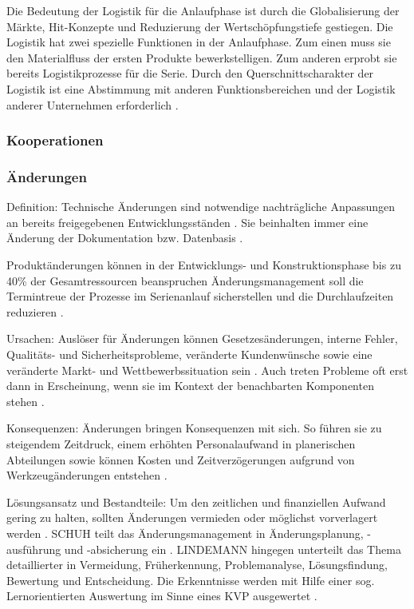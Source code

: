 Die Bedeutung der Logistik für die Anlaufphase ist durch die Globalisierung der Märkte, Hit-Konzepte und Reduzierung der Wertschöpfungstiefe gestiegen. Die Logistik hat zwei spezielle Funktionen in der Anlaufphase. Zum einen muss sie den Materialfluss der ersten Produkte bewerkstelligen. Zum anderen erprobt sie bereits Logistikprozesse für die Serie.
Durch den Querschnittscharakter der Logistik ist eine Abstimmung mit anderen Funktionsbereichen und der Logistik anderer Unternehmen erforderlich \cite[1189]{Pfohl2000}.

\subsubsection*{Kooperationen}

\subsubsection*{Änderungen}

Definition: 
Technische Änderungen sind notwendige nachträgliche Anpassungen an bereits freigegebenen Entwicklungsständen \cite{Zanner2002}. Sie beinhalten immer eine Änderung der Dokumentation bzw. Datenbasis \cite[47]{Niemerg1997}. 	


Produktänderungen können in der Entwicklungs- und Konstruktionsphase bis zu 40\% der Gesamtressourcen beanspruchen \cite{Lindemann1998}
Änderungsmanagement soll die Termintreue der Prozesse im Serienanlauf sicherstellen und die Durchlaufzeiten reduzieren \cite[216]{Schuh2008}. 

Ursachen: 
Auslöser für Änderungen können Gesetzesänderungen, interne Fehler, Qualitäts- und Sicherheitsprobleme, veränderte Kundenwünsche sowie eine veränderte Markt- und Wettbewerbssituation sein \cite{Zanner2002}. Auch treten Probleme oft erst dann in Erscheinung, wenn sie im Kontext der benachbarten Komponenten stehen \cite[24]{Kuhn2002}.

Konsequenzen: 
Änderungen bringen Konsequenzen mit sich. So führen sie zu steigendem Zeitdruck, einem erhöhten Personalaufwand in planerischen Abteilungen sowie können Kosten und Zeitverzögerungen aufgrund von Werkzeugänderungen entstehen \cite[24]{Kuhn2002}. 

Lösungsansatz und Bestandteile: 
Um den zeitlichen und finanziellen Aufwand gering zu halten, sollten Änderungen vermieden oder möglichst vorverlagert werden \cite{Schuh2008, Jania2004, Ass98}. 
SCHUH teilt das Änderungsmanagement in Änderungsplanung, -ausführung und -absicherung ein \cite[217]{Schuh2008}. 
LINDEMANN hingegen unterteilt das Thema detaillierter in Vermeidung, Früherkennung, Problemanalyse, Lösungsfindung, Bewertung und Entscheidung. Die Erkenntnisse werden mit Hilfe einer sog. Lernorientierten Auswertung im Sinne eines KVP ausgewertet \cite{Lindemann1998}. 

